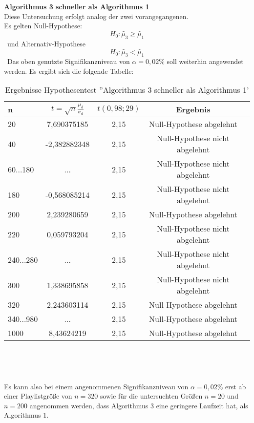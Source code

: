 \documentclass[
10pt, %
a4paper, %
oneside, %
headinclude,footinclude, %
BCOR5mm, %
]{scrartcl}
\begin{document}
\textbf{Algorithmus 3 schneller als Algorithmus 1}\\
Diese Untersuchung erfolgt analog der zwei vorangegangenen.\\
Es gelten Null-Hypothese:
\begin{equation}
H_0: \tilde{ \mu_3 } \ge \tilde{\mu_1}
\end{equation}\
und Alternativ-Hypothese
\begin{equation}
H_0: \tilde{ \mu_3 } < \tilde{\mu_1}
\end{equation}\
Das oben genutzte Signifikanzniveau von \(\alpha = 0,02\%\) soll weiterhin angewendet werden. Es ergibt sich die folgende Tabelle:

\begin{table}[h!]
	\centering 
	\begin{tabular}{|l|c|c|c|c|}
		\hline
		n   &		\(t=\sqrt{n}\frac{\mu_d}{\sigma_d} \)				& \(t(0,98;29)\) &	Ergebnis\\
		\hline
		20   	&	7,690375185	& 2,15 &	Null-Hypothese abgelehnt\\
		\hline
		40   	&	-2,382882348	& 2,15 &	Null-Hypothese nicht abgelehnt\\
		\hline
		60...180   	&	...	& 2,15 &	Null-Hypothese nicht abgelehnt\\
		\hline
		180   &			-0,568085214		  & 2,15 &		Null-Hypothese nicht abgelehnt\\
		\hline
		200   &		2,239280659  &	 2,15 &	Null-Hypothese abgelehnt\\
		\hline
		220   &	0,059793204	   &	 2,15 &	Null-Hypothese nicht abgelehnt\\
		\hline
		240...280   &		...			  &	 2,15 &	Null-Hypothese nicht abgelehnt\\
		\hline
		300   &		1,338695858	&  2,15 &	Null-Hypothese nicht abgelehnt\\
		\hline
		320   &		2,243603114	&  2,15 &	Null-Hypothese abgelehnt\\
		\hline
		340...980   &		...	&  2,15 &	Null-Hypothese abgelehnt\\
		\hline
		1000   &	8,43624219	&  2,15 &	Null-Hypothese abgelehnt\\
		\hline
	\end{tabular}\\
	\caption[]{Ergebnisse Hypothesentest ''Algorithmus 3 schneller als Algorithmus 1'}
\end{table}\

Es kann also bei einem angenommenen Signifikanzniveau von \(\alpha = 0,02\%\) erst ab einer Playlistgröße von \(n = 320\) sowie für die untersuchten Größen \(n = 20\)  und \(n = 200\) angenommen werden, dass Algorithmus 3 eine geringere Laufzeit hat, als Algorithmus 1.\\
\end{document}
